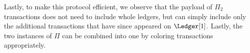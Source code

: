 Lastly, to make this protocol efficient, we observe that the payload of
$\Pi_2$ transactions does not need to include whole ledgers, but can simply
include only the additional transactions that have since appeared on $\Ledger[1]$.
Lastly, the two instances of $\Pi$ can be combined into one by coloring
transactions appropriately.